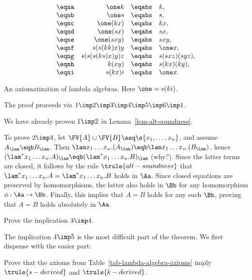 \documentclass[12pt]{article}
\begin{document}
\begin{table}
\[
\begin{array}{crcl}     
  \eqna &    \one k &\eqabs& k,
  \\      \eqnb &    \one s &\eqabs& s,
  \\      \eqnc &    \one(kx) &\eqabs& kx,
  \\      \eqnd &    \one(sx) &\eqabs& sx,
  \\      \eqne &    \one(sxy) &\eqabs& sxy,
  \\      \eqnf &    s(s(kk)x)y  &\eqabs&\one x,
  \\      \eqng &    s(s(s(ks)x)y)z  &\eqabs&  s(sxz)(syz),
  \\      \eqnh &    k(xy)  &\eqabs&  s(kx)(ky),
  \\      \eqni &    s(kx)i  &\eqabs&\one x.
\end{array}
\]
  \caption{An axiomatization of lambda algebras. Here $\one=s(ki)$.}\label{tab-lambda-algebra-axioms}
\end{table}

The proof proceeds via $1\imp 2\imp 3\imp 4\imp 5\imp 6\imp 1$. 

We have already proven $1\imp 2$ in Lemma~\ref{lem-alt-soundness}.

To prove $2\imp 3$, let $\FV{A}\cup\FV{B}\seq\s{x_1,\ldots,x_n}$, and
assume $A_\lam \eqb B_\lam$. Then $\lam x_1\ldots x_n.(A_\lam)\eqb
\lam x_1\ldots x_n.(B_\lam)$, hence $(\lam^* x_1\ldots x_n.A)_\lam
\eqb (\lam^* x_1\ldots x_n.B)_\lam$ (why?). Since the latter terms are
closed, it follows by the rule $\trule{alt-soundness}$ that $\lam^* x_1\ldots
x_n.A=\lam^* x_1\ldots x_n.B$ holds in $\Aa$. Since closed equations
are preserved by homomorphisms, the latter also holds in $\Bb$ for any
homomorphism $\phi:\Aa\to\Bb$. Finally, this implies that $A=B$ holds
for any such $\Bb$, proving that $A=B$ holds absolutely in $\Aa$.

\begin{exercise}
  Prove the implication $3\imp 4$.
\end{exercise}

The implication $4\imp 5$ is the most difficult part of the theorem.
We first dispense with the easier part:

\begin{exercise}
  Prove that the axioms from Table~\ref{tab-lambda-algebra-axioms}
  imply $\trule{s-derived}$ and $\trule{k-derived}$.
\end{exercise}
\end{document}
